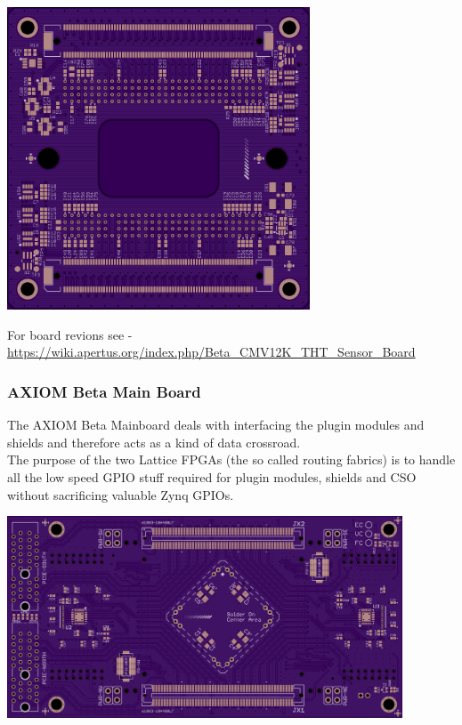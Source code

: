 \begin{center}
\includegraphics[height=9cm]{images/AXIOM_Beta_Sensor_THT_0.13_Bottom}
\end{center}

For board revions see - \href{https://wiki.apertus.org/index.php/Beta_CMV12K_THT_Sensor_Board}{https://wiki.apertus.org/index.php/Beta_CMV12K_THT_Sensor_Board}





\subsubsection{AXIOM Beta Main Board}

The AXIOM Beta Mainboard deals with interfacing the plugin modules and shields and therefore acts as a kind of data crossroad.\\

The purpose of the two Lattice FPGAs (the so called routing fabrics) is to handle all the low speed GPIO stuff required for plugin modules, shields and CSO without sacrificing valuable Zynq GPIOs.\\

\begin{center}
\includegraphics[height=6cm]{images/Beta_Main_Board_Top}
\end{center}

